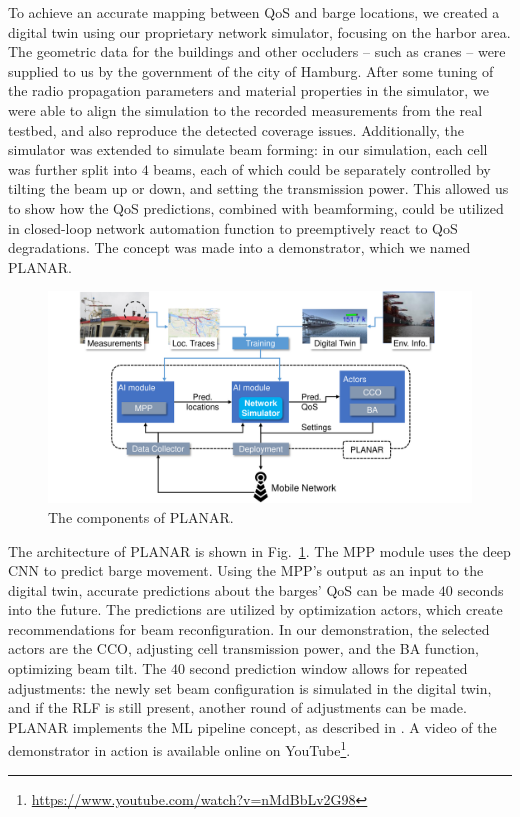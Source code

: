 			To achieve an accurate mapping between \ac{QoS} and barge locations, we created a digital twin using our proprietary network simulator, focusing on the harbor area.
			The geometric data for the buildings and other occluders -- such as cranes -- were supplied to us by the government of the city of Hamburg.
			After some tuning of the radio propagation parameters and material properties in the simulator, we were able to align the simulation to the recorded measurements from the real testbed, and also reproduce the detected coverage issues.
			Additionally, the simulator was extended to simulate beam forming: in our simulation, each cell was further split into $4$ beams, each of which could be separately controlled by tilting the beam up or down, and setting the transmission power.
			This allowed us to show how the \ac{QoS} predictions, combined with beamforming, could be utilized in closed-loop network automation function to preemptively react to \ac{QoS} degradations.
			The concept was made into a demonstrator, which we named \ac{PLANAR}.
			
			\begin{figure}[ht]
				\centering
				\includegraphics[width=\columnwidth]{figures/10_pred_control/pred_control_architecture/architecture.pdf}
				\caption[PLANAR overview]{The components of PLANAR.}
				\label{fig:pred_control_architecture}
			\end{figure}
			
			The architecture of \ac{PLANAR} is shown in Fig.~\ref{fig:pred_control_architecture}.
			The \ac{MPP} module uses the deep \ac{CNN} to predict barge movement.
			Using the \ac{MPP}'s output as an input to the digital twin, accurate predictions about the barges' \ac{QoS} can be made $40$ seconds into the future.
			The predictions are utilized by optimization actors, which create recommendations for beam reconfiguration.
			In our demonstration, the selected actors are the \ac{CCO}, adjusting cell transmission power, and the \ac{BA} function, optimizing beam tilt.
			The $40$ second prediction window allows for repeated adjustments: the newly set beam configuration is simulated in the digital twin, and if the \ac{RLF} is still present, another round of adjustments can be made.
			\ac{PLANAR} implements the \ac{ML} pipeline concept, as described in \cite{ML5G2019}.
			A video of the demonstrator in action is available online on YouTube\footnote{\url{https://www.youtube.com/watch?v=nMdBbLv2G98}}.
			
